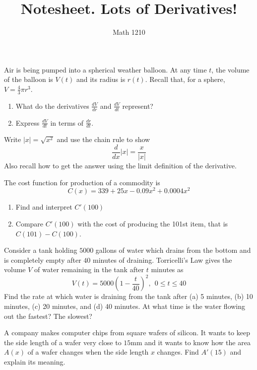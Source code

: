 \documentclass[12pt, a4paper]{article}
\author{Math 1210}
\title{Notesheet. Lots of Derivatives!}
\date{}
\begin{document}
\maketitle
\nameline
\begin{ex}
  Air is being pumped into a spherical weather balloon. At any time
  \(t\), the volume of the balloon is \(V(t)\) and its radius is
  \(r(t)\). Recall that, for a sphere, \(V = \frac{4}{3} \pi r^3\).
  \begin{enumerate}
  \item What do the derivatives \(\frac{dV}{dr}\) and
    \(\frac{dV}{dt}\) represent?
  \item Express \(\frac{dV}{dt}\) in terms of \(\frac{dr}{dt}\).
  \end{enumerate}
\end{ex}
\begin{ex}
  Write \(|x| = \sqrt{x^2}\) and use the chain rule to show \[
    \frac{d}{dx}|x| = \frac{x}{|x|}
  \]
  Also recall how to get the answer using the limit definition of the
  derivative.
\end{ex}
\begin{ex}
  The cost function for production of a commodity is \[
    C(x) = 339 + 25x - 0.09x^2 + 0.0004 x^2
  \]
  \begin{enumerate}
  \item Find and interpret \(C'(100)\)
  \item Compare \(C'(100)\) with the cost of producing the 101st item,
    that is \(C(101) - C(100)\).
  \end{enumerate}
\end{ex}
\begin{ex}
  Consider a tank holding \(5000\) gallons of water which drains from
  the bottom and is completely empty after \(40\) minutes of
  draining. Torricelli's Law gives the volume \(V\) of water remaining
  in the tank after \(t\) minutes as \[
    V(t) = 5000\left( 1 - \frac{t}{40} \right)^2, \ \ 0 \leq t \leq 40
  \]
  Find the rate at which water is draining from the tank after (a) 5
  minutes, (b) 10 minutes, (c) 20 minutes, and (d) 40 minutes. At what
  time is the water flowing out the fastest? The slowest?
\end{ex}
\begin{ex}
  A company makes computer chips from square wafers of silicon. It
  wants to keep the side length of a wafer very close to \(15\)mm and
  it wants to know how the area \(A(x)\) of a wafer changes when the
  side length \(x\) changes. Find \(A'(15)\) and explain its meaning.
\end{ex}
\end{document}
